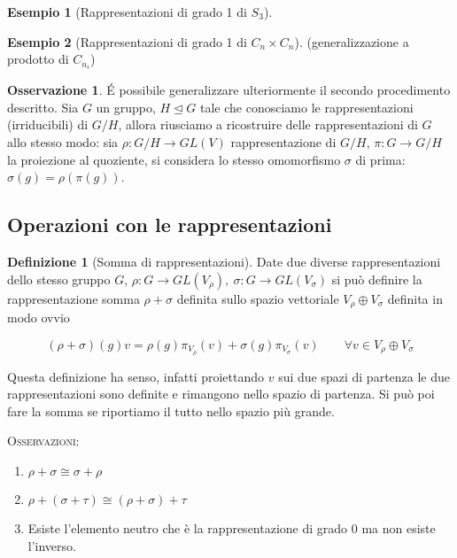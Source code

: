 \documentclass[11pt]{article}
\theoremstyle{plain}
\theoremstyle{definition}
\newtheorem{defn}{Definizione}[section]
\newtheorem{exmp}{Esempio}[section]
\newtheorem*{rem}{Osservazione}
\theoremstyle{remark}
\begin{document}
\begin{exmp}[Rappresentazioni di grado 1 di $S_3$]

\end{exmp}

\begin{exmp}[Rappresentazioni di grado 1 di $C_n \times C_n$]


(generalizzazione a prodotto di $C_{n_i}$)
\end{exmp}

\begin{rem}
	\'E possibile generalizzare ulteriormente il secondo procedimento descritto. Sia $G$ un gruppo, $H\trianglelefteq G$ tale che conosciamo le rappresentazioni (irriducibili) di $G/H$, allora riusciamo a ricostruire delle rappresentazioni di $G$ allo stesso modo: sia $\rho:G/H\to GL(V)$ rappresentazione di $G/H$, $\pi:G\to G/H$ la proiezione al quoziente, si considera lo stesso omomorfismo $\sigma$ di prima: $\sigma(g) = \rho(\pi(g))$.
\end{rem}













\newpage
\subsection{Operazioni con le rappresentazioni}

\begin{defn}[Somma di rappresentazioni]
  Date due diverse rappresentazioni dello stesso gruppo $G$, $\rho: G \to GL(V_\rho), \ \sigma: G \to GL(V_\sigma)$ si può definire la rappresentazione somma $\rho + \sigma$ definita sullo spazio vettoriale $V_\rho \oplus V_\sigma$ definita in modo ovvio

  \[ (\rho + \sigma)(g) v = \rho(g) \pi_{V_\rho}(v) + \sigma(g) \pi_{V_\sigma}(v) \qquad \forall v \in V_\rho \oplus V_\sigma \]

  Questa definizione ha senso, infatti proiettando $v$ sui due spazi di partenza le due rappresentazioni sono definite e rimangono nello spazio di partenza. Si può poi fare la somma se riportiamo il tutto nello spazio più grande.
\label{defn:somma di rappresentazioni}
\end{defn}

\textsc{Osservazioni:}

\begin{enumerate}
\item $\rho + \sigma \cong \sigma + \rho$
\item $\rho + (\sigma + \tau) \cong (\rho + \sigma ) + \tau$
\item Esiste l'elemento neutro che è la rappresentazione di grado 0 ma non esiste l'inverso.

\end{enumerate}
\end{document}
